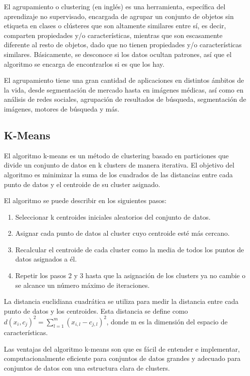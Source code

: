 El agrupamiento o clustering (en inglés) es una herramienta, específica del aprendizaje no supervisado, encargada de agrupar un conjunto de objetos sin etiqueta en clases o clústeres que son altamente similares entre sí, es decir, comparten propiedades y/o características, mientras que son escasamente diferente al resto de objetos, dado que no tienen propiedades y/o características similares. Básicamente, se desconoce si los datos ocultan patrones, así que el algoritmo se encarga de encontrarlos si es que los hay.

El agrupamiento tiene una gran cantidad de aplicaciones en distintos ámbitos de la vida, desde segmentación de mercado hasta en imágenes médicas, así como en análisis de redes sociales, agrupación de resultados de búsqueda, segmentación de imágenes, motores de búsqueda y más.


\subsection{K-Means}
El algoritmo k-means es un método de clustering basado en particiones que divide un conjunto de datos en k clusters de manera iterativa. El objetivo del algoritmo es minimizar la suma de los cuadrados de las distancias entre cada punto de datos y el centroide de su cluster asignado.

El algoritmo se puede describir en los siguientes pasos:
\begin{enumerate}
	\item Seleccionar k centroides iniciales aleatorios del conjunto de datos.
	\item Asignar cada punto de datos al cluster cuyo centroide esté más cercano.
	\item Recalcular el centroide de cada cluster como la media de todos los puntos de datos asignados a él.
	\item Repetir los pasos 2 y 3 hasta que la asignación de los clusters ya no cambie o se alcance un número máximo de iteraciones.
\end{enumerate}

La distancia euclidiana cuadrática se utiliza para medir la distancia entre cada punto de datos y los centroides. Esta distancia se define como $d(x_i, c_j)^2 = \sum_{l=1}^{m}(x_{i,l} - c_{j,l})^2$, donde m es la dimensión del espacio de características.

Las ventajas del algoritmo k-means son que es fácil de entender e implementar, computacionalmente eficiente para conjuntos de datos grandes y adecuado para conjuntos de datos con una estructura clara de clusters.

